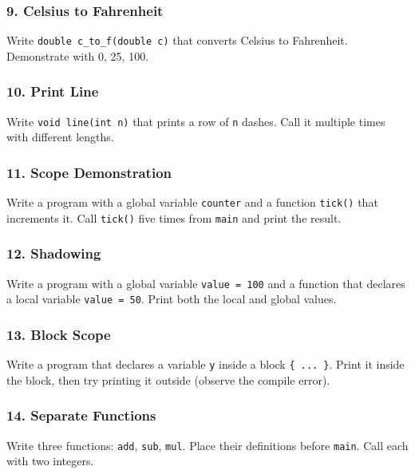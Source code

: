 \documentclass[
  letterpaper,
  DIV=11,
  numbers=noendperiod]{scrreprt}
\begin{document}
\subsubsection{9. Celsius to Fahrenheit}\label{celsius-to-fahrenheit}

Write \texttt{double\ c\_to\_f(double\ c)} that converts Celsius to
Fahrenheit. Demonstrate with 0, 25, 100.

\subsubsection{10. Print Line}\label{print-line}

Write \texttt{void\ line(int\ n)} that prints a row of \texttt{n}
dashes. Call it multiple times with different lengths.

\subsubsection{11. Scope Demonstration}\label{scope-demonstration}

Write a program with a global variable \texttt{counter} and a function
\texttt{tick()} that increments it. Call \texttt{tick()} five times from
\texttt{main} and print the result.

\subsubsection{12. Shadowing}\label{shadowing-1}

Write a program with a global variable \texttt{value\ =\ 100} and a
function that declares a local variable \texttt{value\ =\ 50}. Print
both the local and global values.

\subsubsection{13. Block Scope}\label{block-scope-1}

Write a program that declares a variable \texttt{y} inside a block
\texttt{\{\ ...\ \}}. Print it inside the block, then try printing it
outside (observe the compile error).

\subsubsection{14. Separate Functions}\label{separate-functions}

Write three functions: \texttt{add}, \texttt{sub}, \texttt{mul}. Place
their definitions before \texttt{main}. Call each with two integers.
\end{document}

